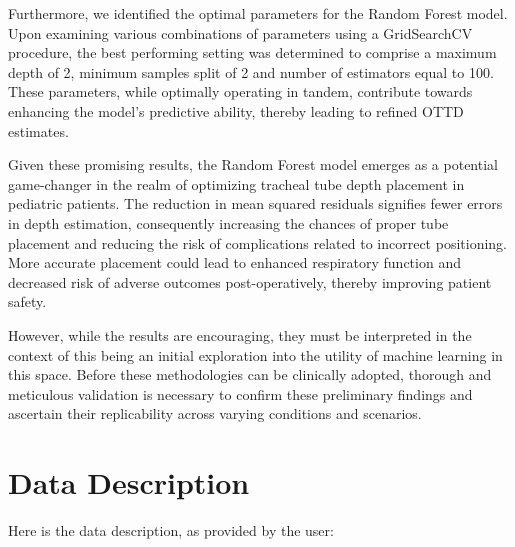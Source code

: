 \documentclass[11pt]{article}
\begin{document}
Furthermore, we identified the optimal parameters for the Random Forest model. Upon examining various combinations of parameters using a GridSearchCV procedure, the best performing setting was determined to comprise a maximum depth of 2, minimum samples split of 2 and number of estimators equal to 100. These parameters, while optimally operating in tandem, contribute towards enhancing the model's predictive ability, thereby leading to refined OTTD estimates.

Given these promising results, the Random Forest model emerges as a potential game-changer in the realm of optimizing tracheal tube depth placement in pediatric patients. The reduction in mean squared residuals signifies fewer errors in depth estimation, consequently increasing the chances of proper tube placement and reducing the risk of complications related to incorrect positioning. More accurate placement could lead to enhanced respiratory function and decreased risk of adverse outcomes post-operatively, thereby improving patient safety.

However, while the results are encouraging, they must be interpreted in the context of this being an initial exploration into the utility of machine learning in this space. Before these methodologies can be clinically adopted, thorough and meticulous validation is necessary to confirm these preliminary findings and ascertain their replicability across varying conditions and scenarios.


\clearpage
\appendix

\section{Data Description} \label{sec:data_description} Here is the data description, as provided by the user:
\end{document}
